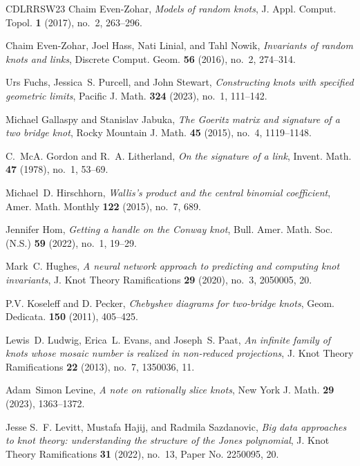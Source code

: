 \documentclass[12pt]{amsart}
\theoremstyle{definition}
\theoremstyle{remark}
\numberwithin{equation}{section}
\begin{document}
\begin{thebibliography}{CDLRRSW23}
Chaim Even-Zohar, \emph{Models of random knots}, J. Appl. Comput. Topol.
  \textbf{1} (2017), no.~2, 263--296.

Chaim Even-Zohar, Joel Hass, Nati Linial, and Tahl Nowik, \emph{Invariants of
  random knots and links}, Discrete Comput. Geom. \textbf{56} (2016), no.~2,
  274--314.

Urs Fuchs, Jessica~S. Purcell, and John Stewart, \emph{Constructing knots with
  specified geometric limits}, Pacific J. Math. \textbf{324} (2023), no.~1,
  111--142.

Michael Gallaspy and Stanislav Jabuka, \emph{The {G}oeritz matrix and signature
  of a two bridge knot}, Rocky Mountain J. Math. \textbf{45} (2015), no.~4,
  1119--1148.

C.~McA. Gordon and R.~A. Litherland, \emph{On the signature of a link}, Invent.
  Math. \textbf{47} (1978), no.~1, 53--69.

Michael~D. Hirschhorn, \emph{Wallis's product and the central binomial
  coefficient}, Amer. Math. Monthly \textbf{122} (2015), no.~7, 689.

Jennifer Hom, \emph{Getting a handle on the {C}onway knot}, Bull. Amer. Math.
  Soc. (N.S.) \textbf{59} (2022), no.~1, 19--29.

Mark~C. Hughes, \emph{A neural network approach to predicting and computing
  knot invariants}, J. Knot Theory Ramifications \textbf{29} (2020), no.~3,
  2050005, 20.

P.V. Koseleff and D. Pecker, \emph{Chebyshev diagrams for two-bridge knots}, Geom. Dedicata. \textbf{150} (2011), 405--425.

Lewis~D. Ludwig, Erica~L. Evans, and Joseph~S. Paat, \emph{An infinite family
  of knots whose mosaic number is realized in non-reduced projections}, J. Knot
  Theory Ramifications \textbf{22} (2013), no.~7, 1350036, 11.

Adam~Simon Levine, \emph{A note on rationally slice knots}, New York J. Math.
  \textbf{29} (2023), 1363--1372.

Jesse S.~F. Levitt, Mustafa Hajij, and Radmila Sazdanovic, \emph{Big data
  approaches to knot theory: understanding the structure of the {J}ones
  polynomial}, J. Knot Theory Ramifications \textbf{31} (2022), no.~13, Paper
  No. 2250095, 20.


\end{thebibliography}
\end{document}
